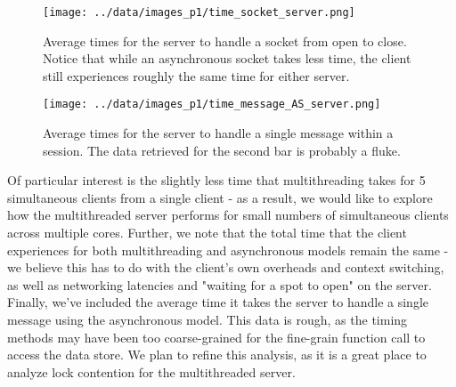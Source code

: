 \documentclass[paper=a4, fontsize=11pt]{scrartcl} %
\numberwithin{equation}{section} %
\numberwithin{figure}{section} %
\numberwithin{table}{section} %
\begin{document}
\begin{figure}
  \centering
    \texttt{[image: ../data/images\_p1/time\_socket\_server.png]}
  \caption{Average times for the server to handle a socket from open to close. Notice that while an asynchronous socket takes less time, the client still experiences roughly the same time for either server.}

  \centering
    \texttt{[image: ../data/images\_p1/time\_message\_AS\_server.png]}
  \caption{Average times for the server to handle a single message within a session. The data retrieved for the second bar is probably a fluke.}
\end{figure}

Of particular interest is the slightly less time that multithreading takes for 5 simultaneous clients from a single client - as a result, we would like to explore how the multithreaded server performs for small numbers of simultaneous clients across multiple cores. Further, we note that the total time that the client experiences for both multithreading and asynchronous models remain the same - we believe this has to do with the client's own overheads and context switching, as well as networking latencies and "waiting for a spot to open" on the server.
\\

Finally, we've included the average time it takes the server to handle a single message using the asynchronous model. This data is rough, as the timing methods may have been too coarse-grained for the fine-grain function call to access the data store. We plan to refine this analysis, as it is a great place to analyze lock contention for the multithreaded server.
\end{document}
